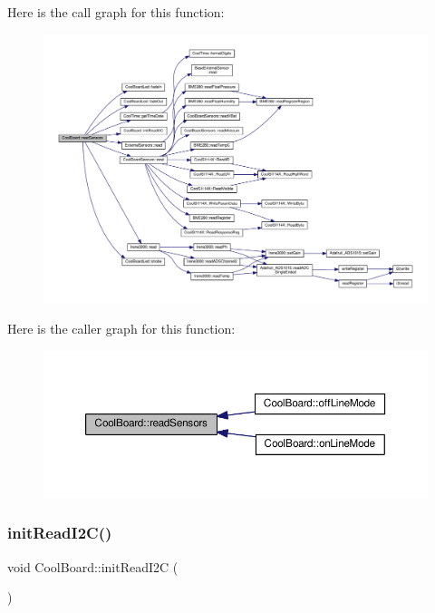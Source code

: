 Here is the call graph for this function\+:\nopagebreak
\begin{figure}[H]
\begin{center}
\leavevmode
\includegraphics[width=350pt]{d7/df9/class_cool_board_ad03abdce2e65f520bbf2cff0f2d083cf_cgraph}
\end{center}
\end{figure}
Here is the caller graph for this function\+:\nopagebreak
\begin{figure}[H]
\begin{center}
\leavevmode
\includegraphics[width=350pt]{d7/df9/class_cool_board_ad03abdce2e65f520bbf2cff0f2d083cf_icgraph}
\end{center}
\end{figure}
\mbox{\label{class_cool_board_a397b46fadab8f530a8cf4d914c561366}} 
\subsubsection{\texorpdfstring{init\+Read\+I2\+C()}{initReadI2C()}}
{\footnotesize\ttfamily void Cool\+Board\+::init\+Read\+I2C (\begin{DoxyParamCaption}{ }\end{DoxyParamCaption})}

